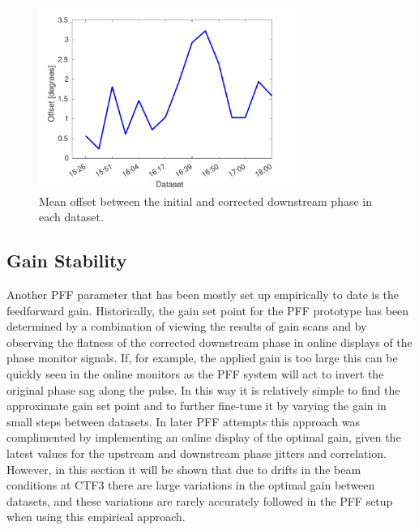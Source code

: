 \begin{figure}
  \centering
  \includegraphics[width=0.75\textwidth]{Figures/feedforward/longFF_phaseOffset}
  \caption{Mean offset between the initial and corrected downstream phase in each dataset.}
  \label{f:longFF_phaseOffset}
\end{figure}

\subsection{Gain Stability}
\label{ss:longFF_gain}

Another PFF parameter that has been mostly set up empirically to date is the feedforward gain. Historically, the gain set point for the PFF prototype has been determined by a combination of viewing the results of gain scans %
and by observing the flatness of the corrected downstream phase in online displays of the phase monitor signals. If, for example, the applied gain is too large this can be quickly seen in the online monitors as the PFF system will act to invert the original phase sag along the pulse. In this way it is relatively simple to find the approximate gain set point and to further fine-tune it by varying the gain in small steps between datasets. In later PFF attempts this approach was complimented by implementing an online display of the optimal gain, given the latest values for the upstream and downstream phase jitters and correlation. However, in this section it will be shown that due to drifts in the beam conditions at CTF3 there are large variations in the optimal gain between datasets, and these variations are rarely accurately followed in the PFF setup when using this empirical approach.

